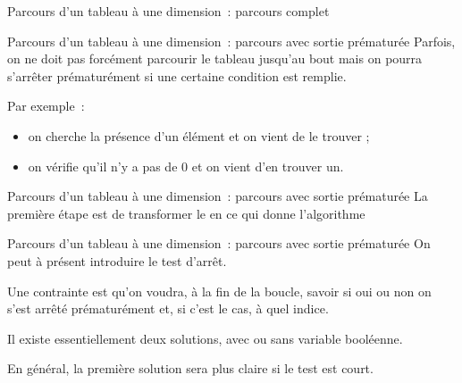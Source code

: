 \begin{frame}{Parcours d'un tableau à une dimension~: parcours complet}
\end{frame}

\begin{frame}{Parcours d'un tableau à une dimension~: parcours avec sortie prématurée}
	Parfois, on ne doit pas forcément parcourir le tableau jusqu'au bout
	mais on pourra s'arrêter prématurément si une certaine condition est remplie.
	
	\bigskip
	
	Par exemple~:
	\begin{itemize}
		\item on cherche la présence d'un élément et on vient de le trouver ;
		\item on vérifie qu'il n'y a pas de $0$ et on vient d'en trouver un.
	\end{itemize}
\end{frame}

\begin{frame}{Parcours d'un tableau à une dimension~: parcours avec sortie prématurée}
	La première étape est de transformer le  en 
	ce qui donne l'algorithme 

\end{frame}

\begin{frame}{Parcours d'un tableau à une dimension~: parcours avec sortie prématurée}
	On peut à présent introduire le test d'arrêt.
	
	Une contrainte est qu'on voudra, à la fin de la boucle, savoir
	si oui ou non on s'est arrêté prématurément et, si c'est le cas,
	à quel indice.
	
	\bigskip

	Il existe essentiellement deux solutions, avec ou sans variable booléenne.
	
	En général, la première solution sera plus claire si le test est court.
\end{frame}

